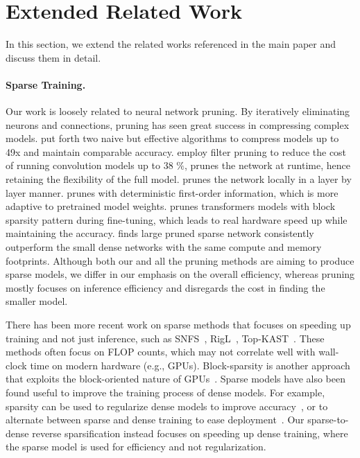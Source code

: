 \section{Extended Related Work}
\label{app:related}
In this section, we extend the related works referenced in the main paper and discuss them in detail.
\paragraph{Sparse Training.} Our work is loosely related to neural network pruning. By iteratively eliminating neurons and connections, pruning has seen great success in compressing complex models. \citet{han2015deep,han2015learning} put forth two naive but effective algorithms to compress models up to 49x and maintain comparable accuracy. \citet{li2016pruning} employ filter pruning to reduce the cost of running convolution models up to 38 $\%$, \citet{NIPS2017_a51fb975} prunes the network at runtime, hence retaining the flexibility of the full model. \citet{dong2017learning} prunes the network locally in a layer by layer manner.  \citet{sanh2020movement} prunes with deterministic first-order information, which is more adaptive to pretrained model weights. \citet{lagunas2021block} prunes transformers models with block sparsity pattern during fine-tuning, which leads to real hardware speed up while maintaining the accuracy. \citet{zhu2017prune} finds large pruned sparse network consistently outperform the small dense networks with the same compute and memory footprints. Although both our and all the pruning methods are aiming to produce sparse models, we differ in our emphasis on the overall efficiency, whereas pruning mostly focuses on inference efficiency and disregards the cost in finding the smaller model.

There has been more recent work on sparse methods that focuses on speeding up
training and not just inference, such as SNFS~\citep{dettmers2019sparse},
RigL~\citep{dettmers2019sparse}, Top-KAST~\citep{jayakumar2021top}.
These methods often focus on FLOP counts, which may not correlate well with
wall-clock time on modern hardware (e.g., GPUs).
Block-sparsity is another approach that exploits the block-oriented nature of
GPUs~\citep{gray2017gpu, child2019generating, guo2020accelerating}.
Sparse models have also been found useful to improve the training process of
dense models.
For example, sparsity can be used to regularize dense models to improve
accuracy~\citep{han2016dsd}, or to alternate between sparse and dense training
to ease deployment~\citep{peste2021ac}.
Our sparse-to-dense reverse sparsification instead focuses on speeding up dense
training, where the sparse model is used for efficiency and not regularization.


